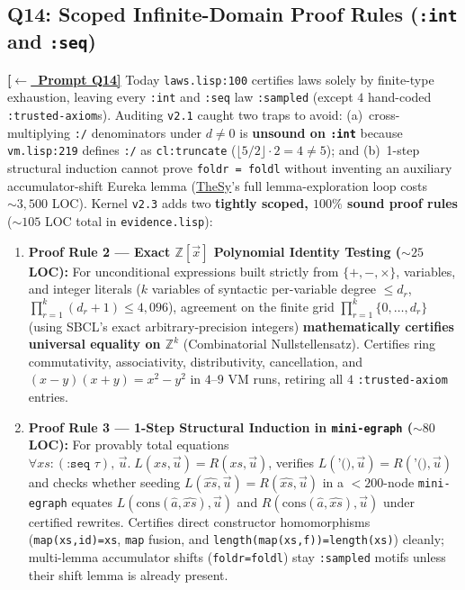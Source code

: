 \documentclass[12pt]{article}
\newcommand{\ansback}[2]{\hyperlink{#1}{\textcolor{qpurple}{\textbf{\small[\(\leftarrow\)~#2]}}}}
\newcommand{\litref}[2]{\hyperlink{lit:#1}{\textcolor{citegreen}{#2}}}
\begin{document}
\subsection{Q14: Scoped Infinite-Domain Proof Rules (\texttt{:int} and \texttt{:seq})}
\label{ans:14}

\ansback{q:14}{Prompt Q14}
Today \texttt{laws.lisp:100} certifies laws solely by finite-type exhaustion, leaving every \texttt{:int} and \texttt{:seq} law \texttt{:sampled} (except $4$ hand-coded \texttt{:trusted-axiom}s). Auditing \texttt{v2.1} caught two traps to avoid: (a)~cross-multiplying \texttt{:/} denominators under $d \ne 0$ is \textbf{unsound on \texttt{:int}} because \texttt{vm.lisp:219} defines \texttt{:/} as \texttt{cl:truncate} ($\lfloor 5/2\rfloor \cdot 2 = 4 \ne 5$); and (b)~1-step structural induction cannot prove \texttt{foldr = foldl} without inventing an auxiliary accumulator-shift Eureka lemma (\litref{singher2021}{TheSy}'s full lemma-exploration loop costs $\sim 3,500$ LOC). Kernel \texttt{v2.3} adds two \textbf{tightly scoped, $100\%$ sound proof rules} ($\sim 105$ LOC total in \texttt{evidence.lisp}):
\begin{enumerate}[leftmargin=1.6em, itemsep=0.2em]
  \item \textbf{Proof Rule 2 --- Exact $\mathbb{Z}[\vec{x}]$ Polynomial Identity Testing ($\sim 25$ LOC):} For unconditional expressions built strictly from $\{+, -, \times\}$, variables, and integer literals ($k$ variables of syntactic per-variable degree $\le d_r$, $\prod_{r=1}^k (d_r+1) \le 4,096$), agreement on the finite grid $\prod_{r=1}^k \{0,\dots,d_r\}$ (using SBCL's exact arbitrary-precision integers) \textbf{mathematically certifies universal equality on $\mathbb{Z}^k$} (Combinatorial Nullstellensatz). Certifies ring commutativity, associativity, distributivity, cancellation, and $(x-y)(x+y)=x^2-y^2$ in $4$--$9$ VM runs, retiring all $4$ \texttt{:trusted-axiom} entries.
  \item \textbf{Proof Rule 3 --- 1-Step Structural Induction in \texttt{mini-\allowbreak egraph} ($\sim 80$ LOC):} For provably total equations $\forall xs : (\texttt{:seq }\tau),\allowbreak\,\vec{u}.\; L(xs,\vec{u}) = R(xs,\vec{u})$, verifies $L(\texttt{'()},\vec{u}) = R(\texttt{'()},\vec{u})$ and checks whether seeding $L(\hat{xs},\vec{u}) = R(\hat{xs},\vec{u})$ in a $<200$-node \texttt{mini-\allowbreak egraph} equates $L(\mathrm{cons}(\hat{a},\hat{xs}),\allowbreak\vec{u})$ and $R(\mathrm{cons}(\hat{a},\hat{xs}),\allowbreak\vec{u})$ under certified rewrites. Certifies direct constructor homomorphisms (\texttt{map(xs,id)\allowbreak =xs}, \texttt{map} fusion, and \texttt{length(map(xs,\allowbreak f))=\allowbreak length(xs)}) cleanly; multi-lemma accumulator shifts (\texttt{foldr=\allowbreak foldl}) stay \texttt{:sampled} motifs unless their shift lemma is already present.
\end{enumerate}
\end{document}
